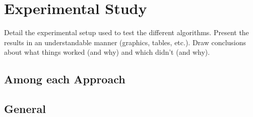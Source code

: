 
\section{Experimental Study} \label{sec:exp}

Detail the experimental setup used to test the different algorithms. Present the results in an understandable manner (graphics, tables, etc.). Draw conclusions about what things worked (and why) and which didn't (and why). 

\subsection{Among each Approach} 

\subsection{General} 